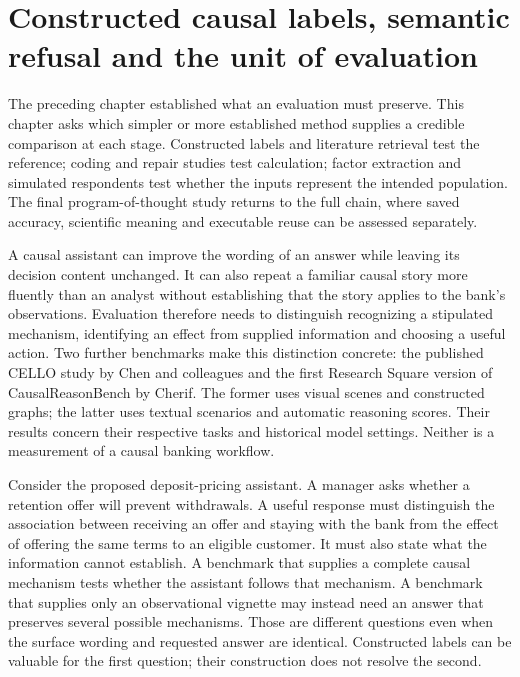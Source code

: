 \section{Constructed causal labels, semantic refusal and the unit of evaluation}
\label{exec17:benchmark-development}

The preceding chapter established what an evaluation must preserve. This chapter asks which simpler or more established method supplies a credible comparison at each stage. Constructed labels and literature retrieval test the reference; coding and repair studies test calculation; factor extraction and simulated respondents test whether the inputs represent the intended population. The final program-of-thought study returns to the full chain, where saved accuracy, scientific meaning and executable reuse can be assessed separately.

A causal assistant can improve the wording of an answer while leaving its
decision content unchanged. It can also repeat a familiar causal story more
fluently than an analyst without establishing that the story applies to the
bank's observations. Evaluation therefore needs to distinguish recognizing a
stipulated mechanism, identifying an effect from supplied information and
choosing a useful action. Two further benchmarks make this distinction
concrete: the published CELLO study by Chen and colleagues and the first
Research Square version of CausalReasonBench by Cherif. The former uses visual
scenes and constructed graphs; the latter uses textual scenarios and automatic
reasoning scores. Their results concern their respective tasks and historical
model settings. Neither is a measurement of a causal banking
workflow.~\citep{exec17_benchmark_cello,exec17_benchmark_cherif}

Consider the proposed deposit-pricing assistant. A manager asks whether a
retention offer will prevent withdrawals. A useful response must distinguish
the association between receiving an offer and staying with the bank from the
effect of offering the same terms to an eligible customer. It must also state
what the information cannot establish. A benchmark that supplies a complete
causal mechanism tests whether the assistant follows that mechanism. A
benchmark that supplies only an observational vignette may instead need an
answer that preserves several possible mechanisms. Those are different
questions even when the surface wording and requested answer are identical.
Constructed labels can be valuable for the first question; their construction
does not resolve the second.

